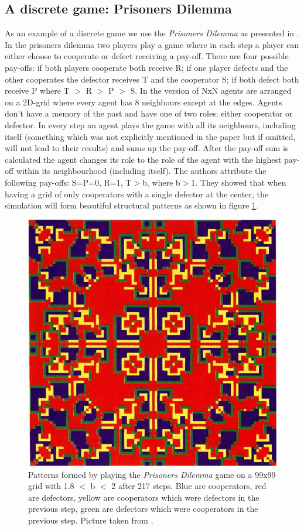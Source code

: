 \subsection{A discrete game: Prisoners Dilemma}
As an example of a discrete game we use the \textit{Prisoners Dilemma} as presented in \cite{nowak_evolutionary_1992}. In the prisoners dilemma two players play a game where in each step a player can either choose to cooperate or defect receiving a pay-off. There are four possible pay-offs: if both players cooperate both receive R; if one player defects and the other cooperates the defector receives T and the cooperator S; if both defect both receive P where T $>$ R $>$ P $>$ S.
In the version of \cite{nowak_evolutionary_1992} NxN agents are arranged on a 2D-grid where every agent has 8 neighbours except at the edges. Agents don't have a memory of the past and have one of two roles: either cooperator or defector. In every step an agent plays the game with all its neighbours, including itself (something which was not explicitly mentioned in the paper but if omitted, will not lead to their results) and sums up the pay-off. After the pay-off sum is calculated the agent changes its role to the role of the agent with the highest pay-off within its neighbourhood (including itself). The authors attribute the following pay-offs: S=P=0, R=1, T$>$b, where b$>$1. They showed that when having a grid of only cooperators with a single defector at the center, the simulation will form beautiful structural patterns as shown in figure \ref{fig:sync_patterns}.

\begin{figure}
	\centering
	\includegraphics[width=.4\textwidth, angle=0]{./fig/sync_patterns.png}
	\caption{Patterns formed by playing the \textit{Prisoners Dilemma} game on a 99x99 grid with 1.8 $<$ b $<$ 2 after 217 steps. Blue are cooperators, red are defectors, yellow are cooperators which were defectors in the previous step, green are defectors which were cooperators in the previous step. Picture taken from \cite{nowak_evolutionary_1992}.}
	\label{fig:sync_patterns}
\end{figure}

